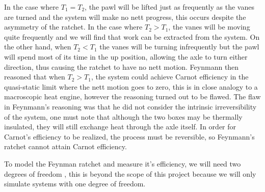 In the case where $T_1 = T_2$, the pawl will be lifted just as frequently as the vanes are turned and the system will make no nett progress, this occurs despite the asymmetry of the ratchet. In the case where $T_2 > T_1$, the vanes will be moving quite frequently and we will find that work can be extracted from the system. On the other hand, when $T_2 < T_1$ the vanes will be turning infrequently but the pawl will spend most of its time in the up position, allowing the axle to turn either direction, thus causing the ratchet to have no nett motion. Feynmann then reasoned that when $T_2 > T_1$, the system could achieve Carnot efficiency in the quasi-static limit where the nett motion goes to zero, this is in close analogy to a macroscopic heat engine, however the reasoning turned out to be flawed. The flaw in Feynmann's reasoning  was that he did not consider the intrinsic irreversibility of the system, one must note that although the two boxes may be thermally insulated, they will still exchange heat through the axle itself. In order for Carnot's efficiency to be realized, the process must be reversible, so Feynmann's ratchet cannot attain Carnot efficiency.  

To model the Feynman ratchet and measure it's efficiency, we will need two degrees of freedom \cite{M.W.Jack2016}, this is beyond the scope of this project because we will only simulate systems with one degree of freedom.

